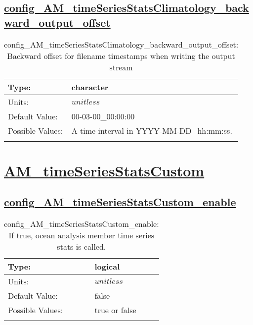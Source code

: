 \subsection[config\_AM\_timeSeriesStatsClimatology\_backward\_output\_offset]{\hyperref[sec:nm_tab_AM_timeSeriesStatsClimatology]{config\_AM\_timeSeriesStatsClimatology\_backward\_output\_offset}}
\label{subsec:nm_sec_config_AM_timeSeriesStatsClimatology_backward_output_offset}
\begin{center}
\begin{longtable}{| p{2.0in} || p{4.0in} |}
    \hline
    Type: & character \\
    \hline
    Units: & $unitless$ \\
    \hline
    Default Value: & 00-03-00\_00:00:00 \\
    \hline
    Possible Values: & A time interval in YYYY-MM-DD\_hh:mm:ss. \\
    \hline
    \caption{config\_AM\_timeSeriesStatsClimatology\_backward\_output\_offset: Backward offset for filename timestamps when writing the output stream}
\end{longtable}
\end{center}
\section[AM\_timeSeriesStatsCustom]{\hyperref[sec:nm_tab_AM_timeSeriesStatsCustom]{AM\_timeSeriesStatsCustom}}
\label{sec:nm_sec_AM_timeSeriesStatsCustom}
\subsection[config\_AM\_timeSeriesStatsCustom\_enable]{\hyperref[sec:nm_tab_AM_timeSeriesStatsCustom]{config\_AM\_timeSeriesStatsCustom\_enable}}
\label{subsec:nm_sec_config_AM_timeSeriesStatsCustom_enable}
\begin{center}
\begin{longtable}{| p{2.0in} || p{4.0in} |}
    \hline
    Type: & logical \\
    \hline
    Units: & $unitless$ \\
    \hline
    Default Value: & false \\
    \hline
    Possible Values: & true or false \\
    \hline
    \caption{config\_AM\_timeSeriesStatsCustom\_enable: If true, ocean analysis member time series stats is called.}
\end{longtable}
\end{center}
